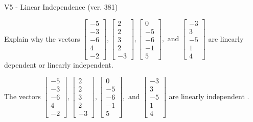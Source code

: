 \begin{exercise}
  \begin{exerciseTitle}V5 - Linear Independence (ver. 381)\end{exerciseTitle}
  \begin{exerciseStatement}
    Explain why the vectors \(\left[\begin{array}{r}
-5 \\
-3 \\
-6 \\
4 \\
-2
\end{array}\right] , \left[\begin{array}{r}
2 \\
2 \\
3 \\
2 \\
-3
\end{array}\right] , \left[\begin{array}{r}
0 \\
-5 \\
-6 \\
-1 \\
5
\end{array}\right] , \text{ and } \left[\begin{array}{r}
-3 \\
3 \\
-5 \\
1 \\
4
\end{array}\right]\) are linearly dependent or linearly independent.	


  \end{exerciseStatement}
  \begin{exerciseAnswer}
   The vectors \(\left[\begin{array}{r}
-5 \\
-3 \\
-6 \\
4 \\
-2
\end{array}\right] , \left[\begin{array}{r}
2 \\
2 \\
3 \\
2 \\
-3
\end{array}\right] , \left[\begin{array}{r}
0 \\
-5 \\
-6 \\
-1 \\
5
\end{array}\right] , \text{ and } \left[\begin{array}{r}
-3 \\
3 \\
-5 \\
1 \\
4
\end{array}\right]\) are 
  	 linearly independent  .
  


  \end{exerciseAnswer}
\end{exercise}